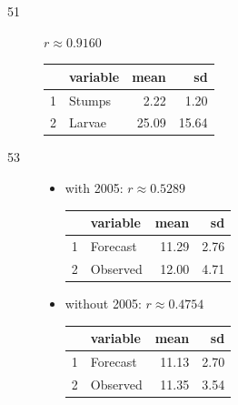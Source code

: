 \documentclass[letterpaper]{exam}
\begin{document}
\begin{description}
      \item[51] $r \approx 0.9160$

        \begin{tabular}{rlrr}
          \toprule
             & variable & mean  & sd \\
          \midrule
          1  & Stumps   & 2.22  & 1.20 \\
          2  & Larvae   & 25.09 & 15.64 \\
          \bottomrule
        \end{tabular}


      \item[53]
        \begin{itemize}
          \item with 2005: $r \approx 0.5289$

            \begin{tabular}{rlrr}
              \toprule
                & variable & mean  & sd \\
              \midrule
              1 & Forecast & 11.29 & 2.76 \\
              2 & Observed & 12.00 & 4.71 \\
              \bottomrule
            \end{tabular}


          \item without 2005: $r \approx 0.4754$

          \begin{tabular}{rlrr}
            \toprule
              & variable & mean  & sd \\
            \midrule
            1 & Forecast & 11.13 & 2.70 \\ 
            2 & Observed & 11.35 & 3.54 \\ 
            \bottomrule
          \end{tabular}
        \end{itemize}

    \end{description}
  \fi
\end{document}
